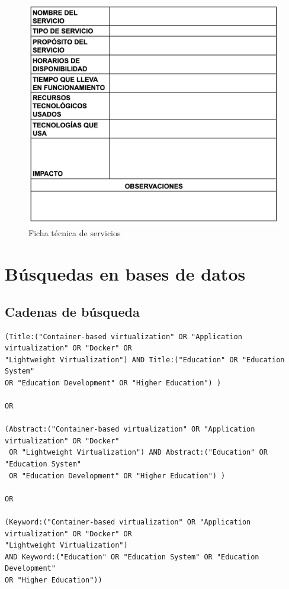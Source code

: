 \begin{figure}[H]
    \centering
    \includegraphics[width=\textwidth,height=0.85\textheight,keepaspectratio]{apendices/caracterizacionServicios.png}
    \caption{Ficha técnica de servicios}\label{fig:tabla-ficha-servicios}
\end{figure}
\FloatBarrier\clearpage

\chapter{Búsquedas en bases de datos}

\section{Cadenas de búsqueda}\label{sec:cadenas-busqueda}


\begin{tcolorbox}[
  colback=gray!5, 
  colframe=black!60, 
  title=Cadena de búsqueda en ACM para educación, 
  fonttitle=\bfseries, 
  sharp corners=south
]
\scriptsize %
\begin{verbatim}
(Title:("Container-based virtualization" OR "Application virtualization" OR "Docker" OR 
"Lightweight Virtualization") AND Title:("Education" OR "Education System" 
OR "Education Development" OR "Higher Education") ) 

OR

(Abstract:("Container-based virtualization" OR "Application virtualization" OR "Docker"
 OR "Lightweight Virtualization") AND Abstract:("Education" OR "Education System" 
 OR "Education Development" OR "Higher Education") )

OR

(Keyword:("Container-based virtualization" OR "Application virtualization" OR "Docker" OR 
"Lightweight Virtualization")
AND Keyword:("Education" OR "Education System" OR "Education Development" 
OR "Higher Education"))
\end{verbatim}
\end{tcolorbox}

